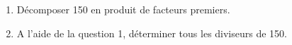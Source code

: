 
\begin{enumerate}
\item Décomposer 150 en produit de facteurs premiers.
\item A l'aide de la question 1, déterminer tous les diviseurs de 150.
\end{enumerate}